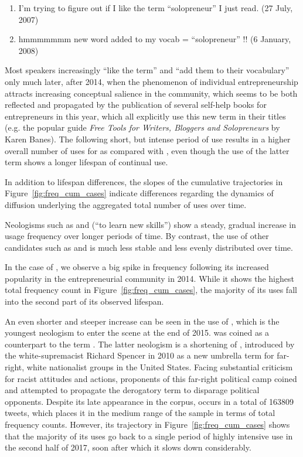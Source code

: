 \documentclass[
  a4paper,
  abstract=on,
  captions=tableabove
  ]{scrartcl}
\begin{document}
      \renewcommand{\labelenumi}{(\arabic{enumi})}
      \begin{enumerate}
        \item I'm trying to figure out if I like the term \enquote{solopreneur} I just read. (27 July, 2007)
        \item hmmmmmmm new word added to my vocab = \enquote{solopreneur} !! (6 January, 2008)
      \end{enumerate}

      Most speakers increasingly \enquote{like the term} and \enquote{add them to their vocabulary} only much later, after 2014, when the phenomenon of individual entrepreneurship attracts increasing conceptual salience in the community, which seems to be both reflected and propagated by the publication of several self-help books for entrepreneurs in this year, which all explicitly use this new term in their titles (e.g. the popular guide \emph{Free Tools for Writers, Bloggers and Solopreneurs} by Karen Banes). The following short, but intense period of use results in a higher overall number of uses for  as compared with , even though the use of the latter term shows a longer lifespan of continual use.

      In addition to lifespan differences, the slopes of the cumulative trajectories in Figure~\ref{fig:freq_cum_cases} indicate differences regarding the dynamics of diffusion underlying the aggregated total number of uses over time.

      Neologisms such as  and  (\enquote{to learn new skills}) show a steady, gradual increase in usage frequency over longer periods of time. By contrast, the use of other candidates such as  and  is much less stable and less evenly distributed over time.

      In the case of , we observe a big spike in frequency following its increased popularity in the entrepreneurial community in 2014. While it shows the highest total frequency count in Figure~\ref{fig:freq_cum_cases}, the majority of its uses fall into the second part of its observed lifespan.

      An even shorter and steeper increase can be seen in the use of , which is the youngest neologism to enter the scene at the end of 2015.  was coined as a counterpart to the term . The latter neologism is a shortening of , introduced by the white-supremacist Richard Spencer in 2010 as a new umbrella term for far-right, white nationalist groups in the United States. Facing substantial criticism for racist attitudes and actions, proponents of this far-right political camp coined and attempted to propagate the derogatory term  to disparage political opponents. Despite its late appearance in the corpus,  occurs in a total of \num{163809} tweets, which places it in the medium range of the sample in terms of total frequency counts. However, its trajectory in Figure~\ref{fig:freq_cum_cases} shows that the majority of its uses go back to a single period of highly intensive use in the second half of 2017, soon after which it slows down considerably.
\end{document}
